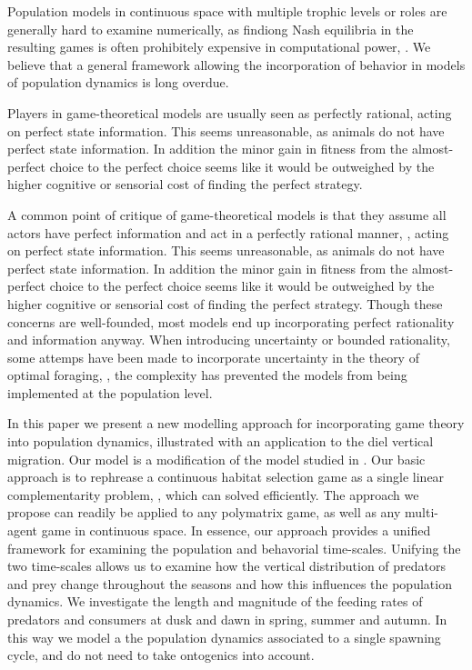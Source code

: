Population models in continuous space with multiple trophic levels or roles are generally hard to examine numerically, as findiong Nash equilibria in the resulting games is often prohibitely expensive in computational power, \citep{empirical_trait,abrams2010implications,pinti2019trophic}. We believe that a general framework allowing the incorporation of behavior in models of population dynamics is long overdue.

Players in game-theoretical models are usually seen as perfectly rational, acting on perfect state information. This seems unreasonable, as animals do not have perfect state information. In addition the minor gain in fitness from the almost-perfect choice to the perfect choice seems like it would be outweighed by the higher cognitive or sensorial cost of finding the perfect strategy.

A common point of critique of game-theoretical models is that they assume all actors have perfect information and act in a perfectly rational manner, \citep{jones1999bounded}, acting on perfect state information. This seems unreasonable, as animals do not have perfect state information. In addition the minor gain in fitness from the almost-perfect choice to the perfect choice seems like it would be outweighed by the higher cognitive or sensorial cost of finding the perfect strategy.
Though these concerns are well-founded, most models end up incorporating perfect rationality and information anyway. When introducing uncertainty or bounded rationality, some attemps have been made to incorporate uncertainty in the theory of optimal foraging, \citep{bayesianmodel, thuijsman1995automata,gigerenzer2001rethinking}, the complexity has prevented the models from being implemented at the population level.

In this paper we present a new modelling approach for incorporating game theory into population dynamics, illustrated with an application to the diel vertical migration. Our model is a modification of the model studied in \citep{verticalmigration}. Our basic approach is to rephrease a continuous habitat selection game as a single linear complementarity problem, \citep{miller1991copositive}, which can solved efficiently. The approach we propose can readily be applied to any polymatrix game, as well as any multi-agent game in continuous space. In essence, our approach provides a unified framework for examining the population and behavorial time-scales.  Unifying the two time-scales allows us to examine how the vertical distribution of predators and prey change throughout the seasons and how this influences the population dynamics. We investigate the length and magnitude of the feeding rates of predators and consumers at dusk and dawn in spring, summer and autumn. In this way we model a the population dynamics associated to a single spawning cycle, and do not need to take ontogenics into account.

